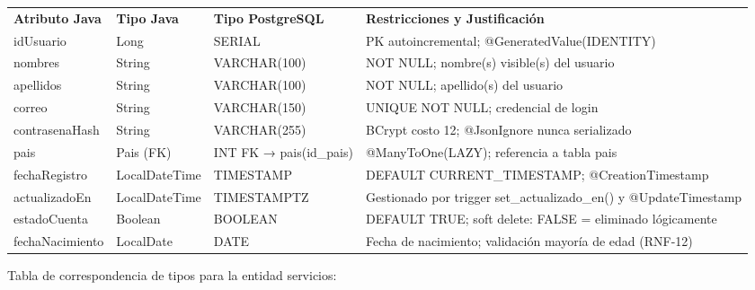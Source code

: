 \documentclass[
]{article}
\begin{document}
\begin{longtable}[]{@{}
  >{\raggedright\arraybackslash}p{}
  >{\raggedright\arraybackslash}p{}
  >{\raggedright\arraybackslash}p{}
  >{\raggedright\arraybackslash}p{}@{}}
\toprule\noalign{}
\endhead
\bottomrule\noalign{}
\endlastfoot
\textbf{Atributo Java} & \textbf{Tipo Java} & \textbf{Tipo PostgreSQL} &
\textbf{Restricciones y Justificación} \\
idUsuario & Long & SERIAL & PK autoincremental;
@GeneratedValue(IDENTITY) \\
nombres & String & VARCHAR(100) & NOT NULL; nombre(s) visible(s) del
usuario \\
apellidos & String & VARCHAR(100) & NOT NULL; apellido(s) del usuario \\
correo & String & VARCHAR(150) & UNIQUE NOT NULL; credencial de login \\
contrasenaHash & String & VARCHAR(255) & BCrypt costo 12; @JsonIgnore
nunca serializado \\
pais & Pais (FK) & INT FK → pais(id\_pais) & @ManyToOne(LAZY);
referencia a tabla pais \\
fechaRegistro & LocalDateTime & TIMESTAMP & DEFAULT CURRENT\_TIMESTAMP;
@CreationTimestamp \\
actualizadoEn & LocalDateTime & TIMESTAMPTZ & Gestionado por trigger
set\_actualizado\_en() y @UpdateTimestamp \\
estadoCuenta & Boolean & BOOLEAN & DEFAULT TRUE; soft delete: FALSE =
eliminado lógicamente \\
fechaNacimiento & LocalDate & DATE & Fecha de nacimiento; validación
mayoría de edad (RNF-12) \\
\end{longtable}

Tabla de correspondencia de tipos para la entidad servicios:
\end{document}
